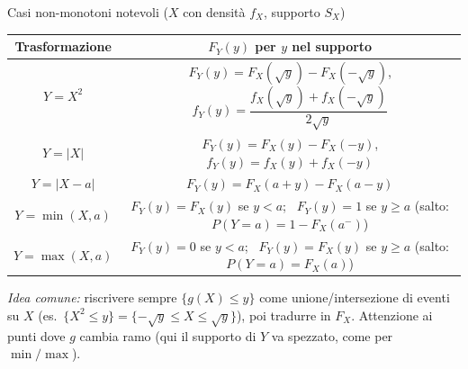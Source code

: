 \documentclass[11pt]{article}
\begin{document}
\begin{concetto}[barSlate]{Casi non-monotoni notevoli ($X$ con densit\`a $f_X$, supporto $S_X$)}
\renewcommand{\arraystretch}{2.1}
\begin{center}
\small
\begin{tabular}{c|c}
Trasformazione & $F_Y(y)$ per $y$ nel supporto \\
\hline
$Y=X^2$ & $F_Y(y)=F_X(\sqrt{y})-F_X(-\sqrt{y})$,\quad $f_Y(y)=\dfrac{f_X(\sqrt y)+f_X(-\sqrt y)}{2\sqrt y}$ \\
$Y=|X|$ & $F_Y(y)=F_X(y)-F_X(-y)$,\quad $f_Y(y)=f_X(y)+f_X(-y)$ \\
$Y=|X-a|$ & $F_Y(y)=F_X(a+y)-F_X(a-y)$ \\
$Y=\min(X,a)$ & $F_Y(y)=F_X(y)$ se $y<a$; \ $F_Y(y)=1$ se $y\ge a$ (salto: $P(Y{=}a)=1-F_X(a^-)$) \\
$Y=\max(X,a)$ & $F_Y(y)=0$ se $y<a$; \ $F_Y(y)=F_X(y)$ se $y\ge a$ (salto: $P(Y{=}a)=F_X(a)$) \\
\end{tabular}
\end{center}
\renewcommand{\arraystretch}{1}
\emph{Idea comune:} riscrivere sempre $\{g(X)\le y\}$ come unione/intersezione di eventi su $X$ (es.\ $\{X^2\le y\}=\{-\sqrt y\le X\le \sqrt y\}$), poi tradurre in $F_X$. Attenzione ai punti dove $g$ cambia ramo (qui il supporto di $Y$ va spezzato, come per $\min/\max$).
\end{concetto}
\end{document}
